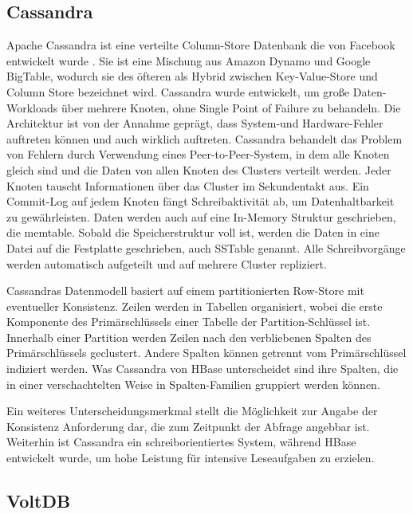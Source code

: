 \subsection{Cassandra} 
\label{ch:AnalyseDatenbanken:sec:Datenbanken:subsec:Cassandra}
Apache Cassandra ist eine verteilte Column-Store Datenbank die von Facebook entwickelt wurde \cite{Lakshman:2010:CDS:1773912.1773922}. Sie ist eine Mischung aus Amazon Dynamo und Google BigTable, wodurch sie des öfteren als Hybrid zwischen Key-Value-Store und Column Store bezeichnet wird. Cassandra wurde entwickelt, um große Daten-Workloads über mehrere Knoten, ohne Single Point of Failure zu behandeln. Die Architektur ist von der Annahme geprägt, dass System-und Hardware-Fehler auftreten können und auch wirklich auftreten. Cassandra behandelt das Problem von Fehlern durch Verwendung eines Peer-to-Peer-System, in dem alle Knoten gleich sind und die Daten von allen Knoten des Clusters verteilt werden. Jeder Knoten tauscht Informationen über das Cluster im Sekundentakt aus. Ein Commit-Log auf jedem Knoten fängt Schreibaktivität ab, um Datenhaltbarkeit zu gewährleisten. Daten werden auch auf eine In-Memory Struktur geschrieben, die memtable. Sobald die Speicherstruktur voll ist, werden die Daten in eine Datei auf die Festplatte geschrieben, auch SSTable genannt. Alle Schreibvorgänge werden automatisch aufgeteilt und auf mehrere Cluster repliziert. 

Cassandras Datenmodell basiert auf einem partitionierten Row-Store mit eventueller Konsistenz. Zeilen werden in Tabellen organisiert, wobei die erste Komponente des Primärschlüssels einer Tabelle der Partition-Schlüssel ist. Innerhalb einer Partition werden Zeilen nach den verbliebenen Spalten des Primärschlüssels geclustert. Andere Spalten können getrennt vom Primärschlüssel indiziert werden. Was Cassandra von HBase unterscheidet sind ihre Spalten, die in einer verschachtelten Weise in Spalten-Familien gruppiert werden können.

Ein weiteres Unterscheidungsmerkmal stellt die Möglichkeit zur Angabe der Konsistenz Anforderung dar, die zum Zeitpunkt der Abfrage angebbar ist. Weiterhin ist Cassandra ein schreiborientiertes System, während HBase entwickelt wurde, um hohe Leistung für intensive Leseaufgaben zu erzielen.

\subsection{VoltDB} 
\label{ch:AnalyseDatenbanken:sec:Datenbanken:subsec:VoltDB}

